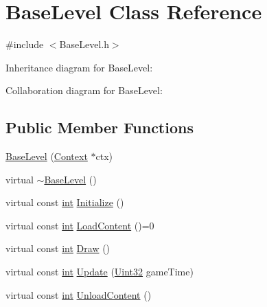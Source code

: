 \hypertarget{class_base_level}{\section{Base\-Level Class Reference}
\label{class_base_level}
}


{\ttfamily \#include $<$Base\-Level.\-h$>$}



Inheritance diagram for Base\-Level\-:


Collaboration diagram for Base\-Level\-:
\subsection*{Public Member Functions}
\begin{DoxyCompactItemize}
\item 
\hyperlink{class_base_level_ab4f7e37ce7c217b6c389d29b901db851}{Base\-Level} (\hyperlink{class_context}{Context} $\ast$ctx)
\item 
virtual \hyperlink{class_base_level_ac03ec19ef952b6a692eae3bbc34dcf87}{$\sim$\-Base\-Level} ()
\item 
virtual const \hyperlink{_s_d_l__thread_8h_a6a64f9be4433e4de6e2f2f548cf3c08e}{int} \hyperlink{class_base_level_a016cc29ef95724ef03ce1cee8abf7248}{Initialize} ()
\item 
virtual const \hyperlink{_s_d_l__thread_8h_a6a64f9be4433e4de6e2f2f548cf3c08e}{int} \hyperlink{class_base_level_a772f50dac61e9f5907ef5b0cc0c13f50}{Load\-Content} ()=0
\item 
virtual const \hyperlink{_s_d_l__thread_8h_a6a64f9be4433e4de6e2f2f548cf3c08e}{int} \hyperlink{class_base_level_a51af847cd61e21742636be63b913894e}{Draw} ()
\item 
virtual const \hyperlink{_s_d_l__thread_8h_a6a64f9be4433e4de6e2f2f548cf3c08e}{int} \hyperlink{class_base_level_adb9988c217366173515d27cb500da5d7}{Update} (\hyperlink{_s_d_l__stdinc_8h_add440eff171ea5f55cb00c4a9ab8672d}{Uint32} game\-Time)
\item 
virtual const \hyperlink{_s_d_l__thread_8h_a6a64f9be4433e4de6e2f2f548cf3c08e}{int} \hyperlink{class_base_level_a5aaf0ec98a8dba18d4ca436d26a7ae58}{Unload\-Content} ()
\end{DoxyCompactItemize}
